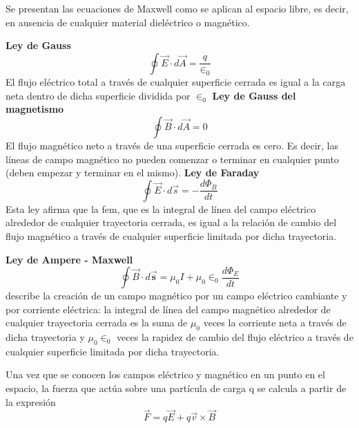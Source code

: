 \documentclass[10pt]{article}
\begin{document}
Se presentan las ecuaciones de Maxwell como se aplican al espacio libre, es decir,
en ausencia de cualquier material dieléctrico o magnético.

\textbf{Ley de Gauss}
\begin{equation*}
	\oint \overrightarrow{E} \cdot d \overrightarrow{A} = \dfrac{q}{\in_0}
\end{equation*}
El flujo eléctrico total a través de cualquier superficie cerrada es igual a la carga neta dentro de dicha superficie dividida por $\in_0$
\textbf{Ley de Gauss del magnetismo}
\begin{equation*}
	\oint \overrightarrow{B} \cdot d \overrightarrow{A} = 0
\end{equation*}
El flujo magnético
neto a través de una superficie cerrada es cero. Es decir, las líneas de campo magnético no pueden comenzar o terminar
en cualquier punto (deben empezar y terminar en el mismo).
\textbf{Ley de Faraday}
\begin{equation*}
	\oint \overrightarrow{E} \cdot d \overrightarrow{s} = - \dfrac{d \Phi_B}{dt}
\end{equation*}
 Esta ley afirma que la fem, que es la
integral de línea del campo eléctrico alrededor de cualquier trayectoria cerrada, es igual
a la relación de cambio del flujo magnético a través de cualquier superficie limitada por
dicha trayectoria.

\textbf{Ley de Ampere - Maxwell}
\begin{equation*}
	\oint \overrightarrow{B} \cdot d \overrightarrow{\textbf{s}} =  \mu_0 I + \mu_0 \in_0 \dfrac{d\Phi_E}{dt}
\end{equation*}
describe la creación de un campo magnético por un campo eléctrico cambiante y por corriente eléctrica: la integral de línea
del campo magnético alrededor de cualquier trayectoria cerrada es la suma de $\mu_0$ veces
la corriente neta a través de dicha trayectoria y $\mu_0 \in_0$ veces la rapidez de cambio del flujo
eléctrico a través de cualquier superficie limitada por dicha trayectoria.\\
\linebreak

Una vez que se conocen los campos eléctrico y magnético en un punto en el espacio,
la fuerza que actúa sobre una partícula de carga q se calcula a partir de la expresión
\begin{equation*}
	\overrightarrow{F}= q\overrightarrow{E} + q\overrightarrow{v} \times \overrightarrow{B}
\end{equation*}
\end{document}
